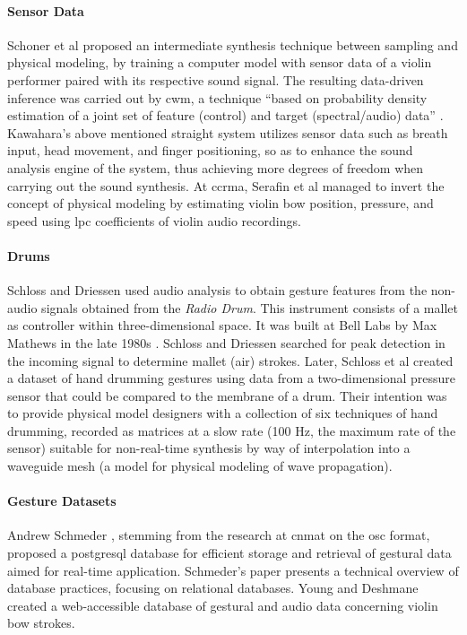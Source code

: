 \paragraph{Sensor Data}
Schoner et al \parencite{DBLP:conf/icmc/SchonerCDG98} proposed an intermediate synthesis technique between sampling and physical modeling, by training a computer model with sensor data of a violin performer paired with its respective sound signal. The resulting data-driven inference was carried out by \gls{cwm}, a technique ``based on probability density estimation of a joint set of feature (control) and target (spectral/audio) data'' \parencite{DBLP:conf/icmc/SchonerCDG98}. Kawahara's above mentioned \gls{straight} system \parencite{icmc/bbp2372.1999.411} utilizes sensor data such as breath input, head movement, and finger positioning, so as to enhance the sound analysis engine of the system, thus achieving more degrees of freedom when carrying out the sound synthesis. At \gls{ccrma}, Serafin et al \parencite{icmc/bbp2372.2001.071} managed to invert the concept of physical modeling by estimating violin bow position, pressure, and speed using \gls{lpc} coefficients of violin audio recordings. 

\paragraph{Drums}
Schloss and Driessen \parencite{icmc/bbp2372.2001.103} used audio analysis to obtain gesture features from the non-audio signals obtained from the \textit{Radio Drum}. This instrument consists of a mallet as controller within three-dimensional space. It was built at Bell Labs by Max Mathews in the late 1980s \parencite{icmc/bbp2372.2001.103}. Schloss and Driessen searched for peak detection in the incoming signal to determine mallet (air) strokes. Later, Schloss et al \parencite{DBLP:conf/icmc/JonesLS07} created a dataset of hand drumming gestures using data from a two-dimensional pressure sensor that could be compared to the membrane of a drum. Their intention was to provide physical model designers with a collection of six techniques of hand drumming, recorded as matrices at a slow rate (100 Hz, the maximum rate of the sensor) suitable for non-real-time synthesis by way of interpolation into a waveguide mesh (a model for physical modeling of wave propagation).

\paragraph{Gesture Datasets}
Andrew Schmeder \parencite{icmc/bbp2372.2009.005}, stemming from the research at \gls{cnmat} on the \gls{osc} format, proposed a \gls{postgresql} database for efficient storage and retrieval of gestural data aimed for real-time application. Schmeder's paper presents a technical overview of database practices, focusing on relational databases. Young and Deshmane \parencite{Young2007} created a web-accessible database of gestural and audio data concerning violin bow strokes. 

